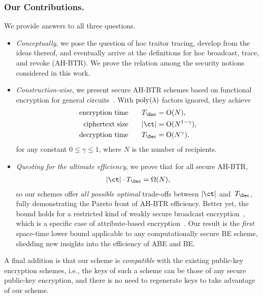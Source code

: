 \subsubsection{Our Contributions.}
We provide answers to all three questions.
\begin{itemize}
\item \emph{Conceptually}, we pose the question of \ad hoc traitor tracing,
develop from the ideas thereof, and
eventually arrive at the definitions for \ad hoc broadcast, trace, and revoke (AH-BTR)\@.
We prove the relation among the security notions considered in this work.
\item \emph{Construction-wise},
we present secure AH-BTR schemes based on functional encryp\-tion for general circuits~\cite{TCC:BonSahWat11}.
With $\operatorname{poly}(\lambda)$ factors ignored,
they achieve
\begin{align*}
\textup{encryption time}\qquad\qquad\mathllap{T_\Enc}&{}=\bigO(N),\\
\textup{ciphertext size}\qquad\qquad\mathllap{|\ct|}&{}=\bigO(N^{1-\gamma}),\\
\textup{decryption time}\qquad\qquad\mathllap{T_\Dec}&{}=\bigO(N^\gamma),
\end{align*}
for any constant ${0\leq\gamma\leq 1}$,
where $N$ is the number of recipients.
\item \emph{Questing for the ultimate efficiency},
we prove that for all secure AH-BTR,
\begin{align*}
|\ct|\cdot T_\Dec=\bigOmega(N),
\end{align*}
so our schemes offer \emph{all possible optimal} trade-offs between $|\ct|$ and~$T_\Dec$,
fully demonstrating the Pareto front of AH-BTR efficiency.
Better yet, the bound holds for a restricted kind of weakly secure broadcast encryption~\cite{C:FiaNao93},
which is a specific case of attribute-based encryption~\cite{EC:SahWat05,CCS:GPSW06}.
Our result is the \emph{first} space-time lower bound applicable to any computationally secure BE scheme,
shedding new insights into the efficiency of ABE and BE\@.
\end{itemize}
A final addition is that our scheme is \emph{compatible} with the existing public-key encryption schemes,
i.e., the keys of such a scheme can be those of any secure public-key encryption, and
there is no need to regenerate keys to take advantage of our scheme.

